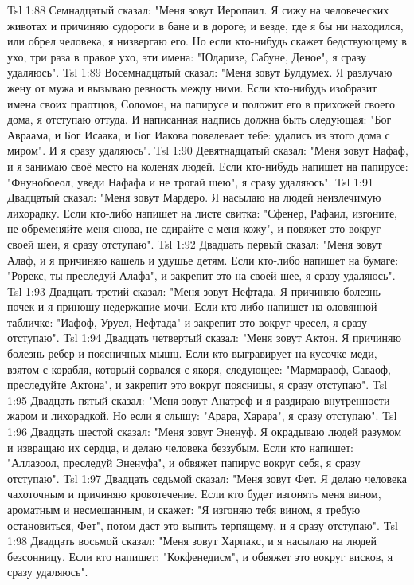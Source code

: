 \vs Tsl 1:88 
Семнадцатый сказал: "Меня зовут Иеропаил. Я сижу на человеческих животах и причиняю судороги в бане и в дороге; и везде, где я бы ни находился, или обрел человека, я низвергаю его. Но если кто-нибудь скажет бедствующему в ухо, три раза в правое ухо, эти имена: "Юдаризе, Сабуне, Деное", я сразу удаляюсь".
\vs Tsl 1:89 
Восемнадцатый сказал: "Меня зовут Булдумех. Я разлучаю жену от мужа и вызываю ревность между ними. Если кто-нибудь изобразит имена своих праотцов, Соломон, на папирусе и положит его в прихожей своего дома, я отступаю оттуда. И написанная надпись должна быть следующая: "Бог Авраама, и Бог Исаака, и Бог Иакова повелевает тебе: удались из этого дома с миром". И я сразу удаляюсь".
\vs Tsl 1:90 
Девятнадцатый сказал: "Меня зовут Нафаф, и я занимаю своё место на коленях людей. Если кто-нибудь напишет на папирусе: "Фнунобоеол, уведи Нафафа и не трогай шею", я сразу удаляюсь".
\vs Tsl 1:91 
Двадцатый сказал: "Меня зовут Мардеро. Я насылаю на людей неизлечимую лихорадку. Если кто-либо напишет на листе свитка: "Сфенер, Рафаил, изгоните, не обременяйте меня снова, не сдирайте с меня кожу", и повяжет это вокруг своей шеи, я сразу отступаю".
\vs Tsl 1:92 
Двадцать первый сказал: "Меня зовут Алаф, и я причиняю кашель и удушье детям. Если кто-либо напишет на бумаге: "Рорекс, ты преследуй Алафа", и закрепит это на своей шее, я сразу удаляюсь".
\vs Tsl 1:93 
Двадцать третий сказал: "Меня зовут Нефтада. Я причиняю болезнь почек и я приношу недержание мочи. Если кто-либо напишет на оловянной табличке: "Иафоф, Уруел, Нефтада" и закрепит это вокруг чресел, я сразу отступаю".
\vs Tsl 1:94 
Двадцать четвертый сказал: "Меня зовут Актон. Я причиняю болезнь ребер и поясничных мышц. Если кто выгравирует на кусочке меди, взятом с корабля, который сорвался с якоря, следующее: "Мармараоф, Саваоф, преследуйте Актона", и закрепит это вокруг поясницы, я сразу отступаю".
\vs Tsl 1:95 
Двадцать пятый сказал: "Меня зовут Анатреф и я раздираю внутренности жаром и лихорадкой. Но если я слышу: "Арара, Харара", я сразу отступаю".
\vs Tsl 1:96 
Двадцать шестой сказал: "Меня зовут Эненуф. Я окрадываю людей разумом и извращаю их сердца, и делаю человека беззубым. Если кто напишет: "Аллазоол, преследуй Эненуфа", и обвяжет папирус вокруг себя, я сразу отступаю".
\vs Tsl 1:97 
Двадцать седьмой сказал: "Меня зовут Фет. Я делаю человека чахоточным и причиняю кровотечение. Если кто будет изгонять меня вином, ароматным и несмешанным, и скажет: "Я изгоняю тебя вином, я требую остановиться, Фет", потом даст это выпить терпящему, и я сразу отступаю".
\vs Tsl 1:98 
Двадцать восьмой сказал: "Меня зовут Харпакс, и я насылаю на людей безсонницу. Если кто напишет: "Кокфенедисм", и обвяжет это вокруг висков, я сразу удаляюсь".
